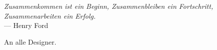 \thispagestyle{empty}
{}

\vspace*{3cm}

\begin{center}
	\emph{Zusammenkommen ist ein Beginn,
	Zusammenbleiben ein Fortschritt, 
	Zusammenarbeiten ein Erfolg.} \\ \medskip
    --- Henry Ford    
\end{center}

\medskip

\begin{center}
    An alle Designer. \\ \smallskip
\end{center}